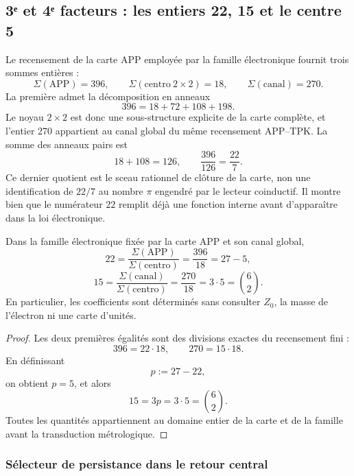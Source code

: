 \subsection{3ᵉ et 4ᵉ facteurs : les entiers 22, 15 et le centre 5}

Le recensement de la carte APP employée par la famille électronique fournit
trois sommes entières :
\[
 \Sigma(\mathrm{APP})=396,
 \qquad
 \Sigma(\mathrm{centro}\ 2\times2)=18,
 \qquad
 \Sigma(\mathrm{canal})=270.
\]
La première admet la décomposition en anneaux
\[
 396=18+72+108+198.
\]
Le noyau \(2\times2\) est donc une sous-structure explicite de la
carte complète, et l'entier 270 appartient au canal global du même recensement
APP--TPK.
La somme des anneaux pairs est
\[
 18+108=126,
 \qquad
 \frac{396}{126}=\frac{22}{7}.
\]
Ce dernier quotient est le sceau rationnel de clôture de la carte, non une
identification de \(22/7\) au nombre \(\pi\) engendré par le lecteur
coinductif. Il montre bien que le numérateur \(22\) remplit déjà une fonction
interne avant d'apparaître dans la loi électronique.

\begin{theorem}
\label{p12-83-c15-s2:thm:coeficientes-electron-rev6}
Dans la famille électronique fixée par la carte APP et son canal global,
\[
 \boxed{
 22=\frac{\Sigma(\mathrm{APP})}
 {\Sigma(\mathrm{centro})}
 =\frac{396}{18}=27-5,}
\]
\[
 \boxed{
 15=\frac{\Sigma(\mathrm{canal})}
 {\Sigma(\mathrm{centro})}
 =\frac{270}{18}=3\cdot5=\binom62.}
\]
En particulier, les coefficients sont déterminés sans consulter
\(Z_0\), la masse de l'électron ni une carte d'unités.
\end{theorem}

\begin{proof}
Les deux premières égalités sont des divisions exactes du recensement fini :
\[
 396=22\cdot18,
 \qquad
 270=15\cdot18.
\]
En définissant
\[
 p:=27-22,
\]
on obtient \(p=5\), et alors
\[
 15=3p=3\cdot5=\binom62.
\]
Toutes les quantités appartiennent au domaine entier de la carte et de la
famille avant la transduction métrologique.
\end{proof}

\subsubsection{Sélecteur de persistance dans le retour central}

